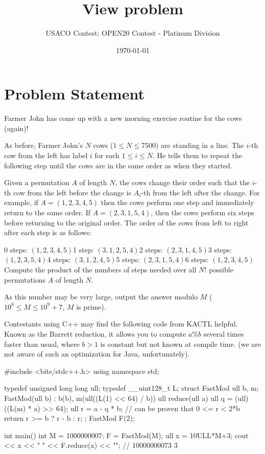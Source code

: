 \documentclass[12pt]{article}
\title{View problem}
\author{USACO Contest: OPEN20 Contest - Platinum Division}
\date{\today}
\begin{document}
\maketitle

\section*{Problem Statement}

Farmer John has come up with a new morning exercise routine for the cows
(again)!

As before, Farmer John's $N$ cows ($1\le N\le 7500$) are standing in a line. 
The $i$-th cow from the left has label $i$ for each $1\le i\le N$. He tells them
to repeat the following step until the cows are in the same order as when they
started.

Given a permutation $A$ of length $N$, the cows change their order such that
the $i$-th cow from the left before the change is $A_i$-th from the left after
the change. 
For example, if $A=(1,2,3,4,5)$ then the cows perform one step and immediately
return to the same order. If $A=(2,3,1,5,4)$, then the cows perform six steps 
before returning to the original order. The order of the cows from left to right
after each step is as follows:

0 steps: $(1,2,3,4,5)$1 step: $(3,1,2,5,4)$2 steps: $(2,3,1,4,5)$3 steps: $(1,2,3,5,4)$4 steps: $(3,1,2,4,5)$5 steps: $(2,3,1,5,4)$6 steps:
$(1,2,3,4,5)$
Compute the product of the numbers of steps needed over all $N!$ possible
permutations $A$ of length $N$.

As this number may be very large, output the answer modulo $M$
($10^8\le M\le 10^9+7$, $M$ is prime). 

Contestants using C++ may find the following code from 
KACTL
helpful. Known as the Barrett
reduction, it allows you to compute $a \% b$ several times faster than
usual, where $b>1$ is constant but not known at compile time. (we are not aware of
such an optimization for Java, unfortunately).


#include <bits/stdc++.h>
using namespace std;

typedef unsigned long long ull;
typedef __uint128_t L;
struct FastMod {
	ull b, m;
	FastMod(ull b) : b(b), m(ull((L(1) << 64) / b)) {}
	ull reduce(ull a) {
		ull q = (ull)((L(m) * a) >> 64);
		ull r = a - q * b; // can be proven that 0 <= r < 2*b
		return r >= b ? r - b : r;
	}
};
FastMod F(2);

int main() {
	int M = 1000000007; F = FastMod(M);
	ull x = 10ULL*M+3; 
	cout << x << " " << F.reduce(x) << "\n"; // 10000000073 3
}
\end{document}
